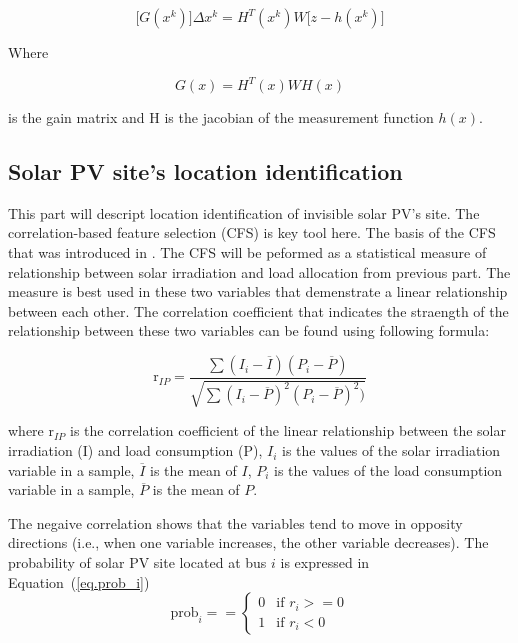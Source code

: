     \begin{equation}
      \big[ G(x^{k}) \big] \Delta x^{k} = H^{T}(x^{k})W \big[ z-h(x^{k}) \big]
    \label{eq.delta_x}
    \end{equation}

    Where

    \begin{equation}
      G(x)=H^{T}(x)WH(x)
    \label{eq.gain}
    \end{equation}

    is the gain matrix and H is the jacobian of the measurement function $h(x)$.

  \subsection{Solar PV site's location identification}

    This part will descript location identification of invisible solar PV's site.
    The correlation-based feature selection (CFS) is key tool here.
    The basis of the CFS that was introduced in \cite{b27}.
    The CFS will be peformed as a statistical measure of relationship between solar irradiation and load allocation from previous part.
    The measure is best used in these two variables that demenstrate a linear relationship between each other.
    The correlation coefficient that indicates the straength of the relationship between these two variables can be found using following formula:

    \begin{equation}
      \text{r}_{IP} =\frac{\sum(I_{i}-\overline{I})(P_{i}-\overline{P})}{\sqrt{\sum(I_{i}-\overline{P})^{2}(P_{i}-\overline{P})^{2})}}
    \label{eq.corr}
    \end{equation}

    where $\text{r}_{IP}$ is the correlation coefficient of the linear relationship between the solar irradiation (I) and load consumption (P),
    $I_{i}$ is the values of the solar irradiation variable in a sample, $\overline{I}$ is the mean of $I$,
    $P_{i}$ is the values of the load consumption variable in a sample, $\overline{P}$ is the mean of $P$.

    The negaive correlation shows that the variables tend to move in opposity directions (i.e., when one variable increases, the other variable decreases).
    The probability of solar PV site located at bus $i$ is expressed in Equation~(\ref{eq.prob_i})
    \begin{equation}
      \text{prob}_{i}= =
      \begin{cases}
        0 & \text{if  $r_{i}>=0$} \\
        1 & \text{if  $r_{i}<0$}
      \end{cases}
    \label{eq.prob_i}
    \end{equation}

